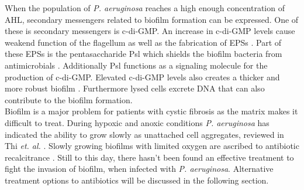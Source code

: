\noindent When the population of \textit{P. aeruginosa} reaches a high enough concentration of AHL, secondary messengers related to biofilm formation can be expressed. One of these is secondary messengers is c-di-GMP. An increase in c-di-GMP levels cause weakend function of the flagellum as well as the fabrication of EPSs \cite{Colvin2012TheMatrix} \cite{Madigan2022BrockMicroorganisms}. Part of these EPSs is the pentasaccharide Psl which shields the biofilm bacteria from antimicrobials \cite{Billings2013TheBiofilms}. Additionally Psl functions as a signaling molecule for the production of c-di-GMP. Elevated c-di-GMP levels also creates a thicker and more robust biofilm \cite{Irie2012Self-producedAeruginosa/i}. Furthermore lysed cells excrete DNA that can also contribute to the biofilm formation.\\

\noindent Biofilm is a major problem for patients with cystic fibrosis as the matrix makes it difficult to treat. During hypoxic and anoxic conditions \textit{P. aeruginosa} has indicated the ability to grow slowly as unattached cell aggregates, reviewed in Thi \textit{et. al.} \cite{Thi2020PseudomonasBiofilms}. Slowly growing biofilms with limited oxygen are ascribed to antibiotic recalcitrance \cite{Thi2020PseudomonasBiofilms}. Still to this day, there hasn't been found an effective treatment to fight the invasion of biofilm, when infected with \textit{P. aeruginosa}. Alternative treatment options to antibiotics will be discussed in the following section. 




